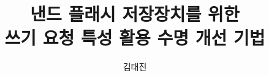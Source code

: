 \documentclass[11pt,b5paper,oneside]{snuthesis-kor}
\title{{\LARGE  낸드 플래시 저장장치를 위한 \\ 쓰기 요청 특성 활용 수명 개선 기법}}
\author{김태진}
\begin{document}
\pagestyle{empty}

\maketitle

\makesubmission


\newpage
\pagestyle{plain}
\setcounter{page}{1}




\renewcommand{\contentsname}{Contents}
\renewcommand{\listfigurename}{List of Figures}
\renewcommand{\listtablename}{List of Tables}
\renewcommand{\bibname}{Bibliography}


\tableofcontents

\listoffigures
 
\listoftables


\clearpagebefore
{}
\setcounter{page}{1}







%

\clearpagebefore
{}
{}
\printindex

%

\normalsize
\end{document}
